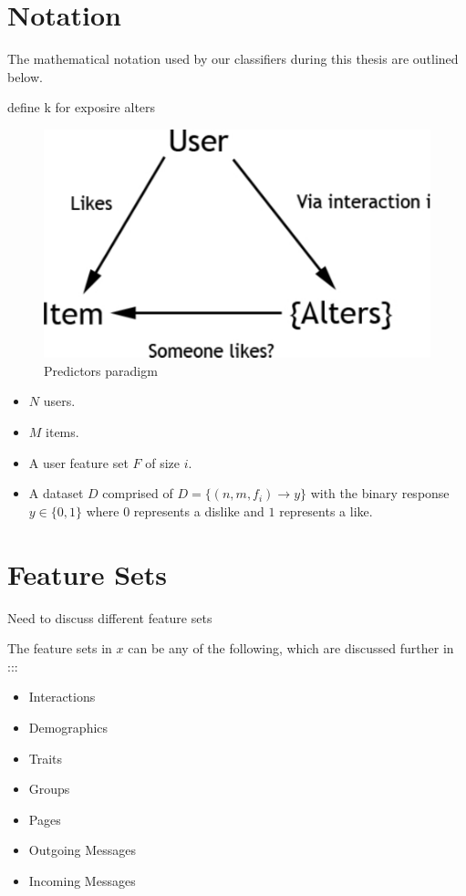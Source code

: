 \section{Notation}
\label{sec:notation}

The mathematical notation used by our classifiers during this thesis are outlined below.


define k for exposire
alters

\begin{figure}[h]
	\begin{center}
		\includegraphics[scale=0.60]{imgs/alters.pdf}
		\caption{Predictors paradigm}
	\end{center}
\end{figure}

\begin{itemize}
\item $N$ users. 
\item $M$ items.
\item A user feature set $F$ of size $i$.
\item A dataset $D$ comprised of $D = \{(n,m,f_i) \to y\}$ with the binary response $y \in \{0,1\}$ where $0$ represents a dislike and $1$ 
represents a like.
\end{itemize}

\section{Feature Sets}
\label{sec:features}

Need to discuss different feature sets

The feature sets in $x$ can be any of the following, which are discussed further in :::

\begin{itemize}
\item Interactions
\item Demographics
\item Traits
\item Groups
\item Pages
\item Outgoing Messages
\item Incoming Messages
\end{itemize}

